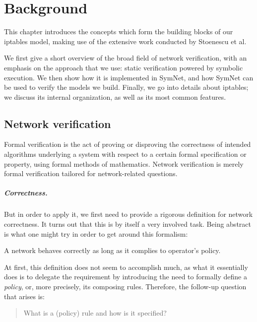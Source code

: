 \chapter{Background}\label{chapter:background}

This chapter introduces the concepts which form the building blocks of our
iptables model, making use of the extensive work conducted by Stoenescu et
al.~\cite{stoenescu2013symnet, stoenescu2016symnet}

We first give a short overview of the broad field of network verification, with
an emphasis on the approach that we use: static verification powered by
symbolic execution.  We then show how it is implemented in SymNet, and how
SymNet can be used to verify the models we build.  Finally, we go into details
about iptables; we discuss its internal organization, as well as its most
common features.


\section{Network verification}\label{sec:network-verification}
Formal verification is the act of proving or disproving the correctness of
intended algorithms underlying a system with respect to a certain formal
specification or property, using formal methods of mathematics. Network
verification is merely formal verification tailored for network-related
questions.

\paragraph{Correctness.}\label{par:correctness}
But in order to apply it, we first need to provide a rigorous definition for
network correctness.  It turns out that this is by itself a very involved task.
Being abstract is what one might try in order to get around this formalism:

\begin{definition}
\label{def:full-correctness}
A network behaves correctly as long as it complies to operator's policy.
\end{definition}

At first, this definition does not seem to accomplish much, as what it
essentially does is to delegate the requirement by introducing the need to
formally define a \emph{policy}, or, more precisely, its composing rules.
Therefore, the follow-up question that arises is:

\begin{quote}
What is a (policy) rule and how is it specified?
\end{quote}

